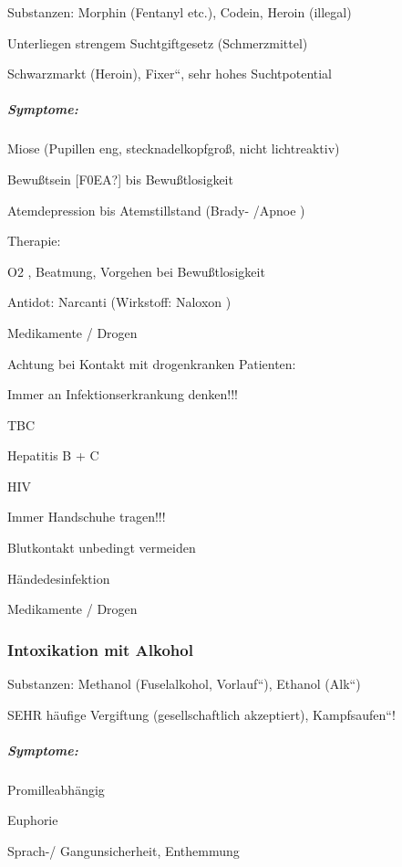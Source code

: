 {\mdseries
Substanzen: Morphin (Fentanyl{\textregistered} etc.), Codein, Heroin
(illegal)}

{\mdseries
Unterliegen strengem Suchtgiftgesetz (Schmerzmittel)}

{\mdseries
Schwarzmarkt (Heroin), {\quotedblbase}Fixer{\textquotedblleft}, sehr
hohes Suchtpotential}

\subparagraph*{Symptome:}

{\mdseries
Miose (Pupillen eng, stecknadelkopfgro{\ss}, nicht  lichtreaktiv)}

{\mdseries
Bewu{\ss}tsein [F0EA?]  bis Bewu{\ss}tlosigkeit}

{\mdseries
Atemdepression bis Atemstillstand (Brady- /Apnoe )}

{\mdseries
Therapie:}

{\mdseries
O2 , Beatmung, Vorgehen bei Bewu{\ss}tlosigkeit}

{\mdseries
Antidot: Narcanti{\textregistered}  (Wirkstoff: Naloxon )}

{\mdseries
Medikamente / Drogen}

{\mdseries
Achtung bei Kontakt mit drogenkranken  Patienten:}

{\mdseries
Immer  an Infektionserkrankung denken!!!}

{\mdseries
TBC}

{\mdseries
Hepatitis B + C}

{\mdseries
HIV}

{\mdseries
Immer Handschuhe tragen!!!}

{\mdseries
Blutkontakt unbedingt vermeiden}

{\mdseries
Händedesinfektion }

{\mdseries
Medikamente / Drogen}

\subsubsection{Intoxikation mit Alkohol}
{\mdseries
Substanzen: Methanol (Fuselalkohol,
{\quotedblbase}Vorlauf{\textquotedblleft}), Ethanol
({\quotedblbase}Alk{\textquotedblleft})}

{\mdseries
SEHR häufige Vergiftung (gesellschaftlich akzeptiert),
{\quotedblbase}Kampfsaufen{\textquotedblleft}!}

\subparagraph*{Symptome: }

{\mdseries
Promilleabhängig}

{\mdseries
Euphorie}

{\mdseries
Sprach-/ Gangunsicherheit, Enthemmung}

